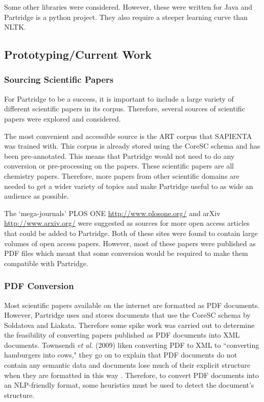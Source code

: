 \documentclass[12pt,a4paper]{article}
\begin{document}
Some other libraries were considered\cite{mallet2002}\cite{cunningham2011text}.
However, these were written for Java and Partridge is a python project. They
also require a steeper learning curve than NLTK. 

\subsection{Prototyping/Current Work}

\subsubsection{ Sourcing Scientific Papers}
For Partridge to be a success, it is important to include a large variety of
different scientific papers in its corpus. Therefore, several sources of
scientific papers were explored and considered.

The most convenient and accessible source is the ART corpus that SAPIENTA was
trained with\cite{citeulike:11077287}. This corpus is already stored using the
CoreSC schema and has been pre-annotated. This means that Partridge would not
need to do any conversion or pre-processing on the papers. These scientific
papers are all chemistry papers. Therefore, more papers from other scientific
domains are needed to get a wider variety of topics and make Partridge useful
to as wide an audience as possible. 

The `mega-journals' PLOS ONE \url{http://www.plosone.org/} and arXiv
\url{http://www.arxiv.org/} were suggested as sources for more open access
articles that could be added to Partridge. Both of these sites were found to
contain large volumes of open access papers. However, most of these papers were
published as PDF files which meant that some conversion would be required to
make them compatible with Partridge.

\subsubsection{PDF Conversion}
Most scientific papers available on the internet are formatted as PDF
documents. However, Partridge uses and stores documents that use the CoreSC
schema by Soldatova and Liakata\cite{liakata2008guidelines}. Therefore some
spike work was carried out to determine the feasibility of converting papers
published as PDF documents into XML documents. Townsendi \emph{et al.} (2009) liken converting
PDF to XML to ``converting hamburgers into cows," they go on to explain that
PDF documents do not contain any semantic data and documents lose much of their
explicit structure when they are formatted in this way \cite{Townsend2009}.
Therefore, to convert PDF documents into an NLP-friendly format, some
heuristics must be used to detect the document's structure\cite{pdfminer}.
\end{document}
